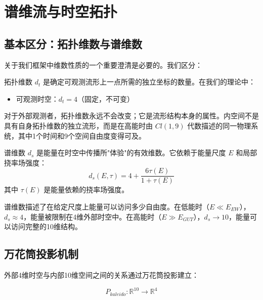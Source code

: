 \section{谱维流与时空拓扑}
\label{sec:spectral_topology}

\subsection{基本区分：拓扑维数与谱维数}

关于我们框架中维数性质的一个重要澄清是必要的。我们区分：

\begin{definition}[拓扑维数]
拓扑维数 $d_t$ 是确定可观测流形上一点所需的独立坐标的数量。在我们的理论中：
\begin{itemize}
    \item 可观测时空：$d_t = 4$（固定，不可变）
\end{itemize}
对于外部观测者，拓扑维数永远不会改变；它是流形结构本身的属性。内空间不是具有自身拓扑维数的独立流形，而是在高能时由 $Cl(1,9)$ 代数描述的同一物理系统，其中1个时间和9个空间自由度变得可及。
\end{definition}

\begin{definition}[谱维数]
谱维数 $d_s$ 是能量在时空中传播所"体验"的有效维数。它依赖于能量尺度 $E$ 和局部挠率场强度：
\begin{equation}
    d_s(E, \tau) = 4 + \frac{6\tau(E)}{1 + \tau(E)}
    \label{eq:spectral_dimension}
\end{equation}
其中 $\tau(E)$ 是能量依赖的挠率场强度。
\end{definition}

\begin{remark}[物理解释]
谱维数描述了在给定尺度上能量可以访问多少自由度。在低能时（$E \ll E_{EW}$），$d_s \approx 4$，能量被限制在4维外部时空中。在高能时（$E \gg E_{GUT}$），$d_s \to 10$，能量可以访问完整的10维结构。
\end{remark}

\subsection{万花筒投影机制}

外部4维时空与内部10维空间之间的关系通过万花筒投影建立：

\begin{equation}
    P_{kaleido}: \mathbb{R}^{10} \to \mathbb{R}^4
    \label{eq:kaleidoscopic_projection}
\end{equation}

